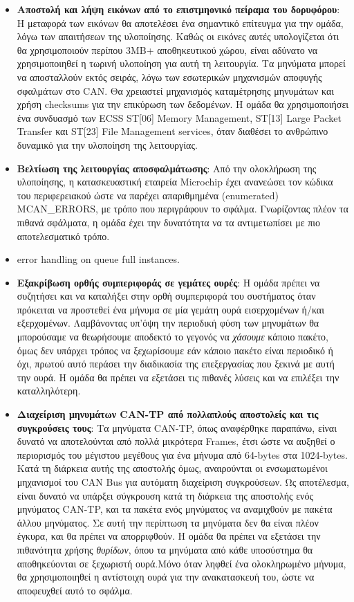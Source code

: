 \documentclass[a4paper,nobib,justified]{tufte-book}
\begin{document}
\begin{itemize}
	\item \textbf{Αποστολή και λήψη εικόνων από το επιστμηονικό πείραμα του δορυφόρου}: Η μεταφορά των εικόνων θα αποτελέσει ένα σημαντικό επίτευγμα για την ομάδα, λόγω των απαιτήσεων της υλοποίησης. Καθώς οι εικόνες αυτές υπολογίζεται ότι θα χρησιμοποιούν περίπου 3MB+ αποθηκευτικού χώρου, είναι αδύνατο να χρησιμοποιηθεί η τωρινή υλοποίηση για αυτή τη λειτουργία. Τα μηνύματα μπορεί να αποσταλλούν εκτός σειράς, λόγω των εσωτερικών μηχανισμών αποφυγής σφαλμάτων στο CAN. Θα χρειαστεί μηχανισμός καταμέτρησης μηνυμάτων και χρήση checksums για την επικύρωση των δεδομένων. Η ομάδα θα χρησιμοποιήσει ένα συνδυασμό των ECSS ST[06] Memory Management, ST[13] Large Packet Transfer και ST[23] File Management services, όταν διαθέσει το ανθρώπινο δυναμικό για την υλοποίηση της λειτουργίας.
	\item \textbf{Βελτίωση της λειτουργίας αποσφαλμάτωσης}: Από την ολοκλήρωση της υλοποίησης, η κατασκευαστική εταιρεία Microchip έχει ανανεώσει τον κώδικα του περιφερειακού ώστε να παρέχει απαριθμημένα (enumerated) MCAN\_ERRORS, με τρόπο που περιγράφουν το σφάλμα. Γνωρίζοντας πλέον τα πιθανά σφάλματα, η ομάδα έχει την δυνατότητα να τα αντιμετωπίσει με πιο αποτελεσματικό τρόπο.
	\item error handling on queue full instances.
	\item \textbf{Εξακρίβωση ορθής συμπεριφοράς σε γεμάτες ουρές}: Η ομάδα πρέπει να συζητήσει και να καταλήξει στην ορθή συμπεριφορά του συστήματος όταν πρόκειται να προστεθεί ένα μήνυμα σε μία γεμάτη ουρά εισερχομένων ή/και εξερχομένων. Λαμβάνοντας υπ'όψη την περιοδική φύση των μηνυμάτων θα μπορούσαμε να θεωρήσουμε αποδεκτό το γεγονός να \emph{χάσουμε} κάποιο πακέτο, όμως δεν υπάρχει τρόπος να ξεχωρίσουμε εάν κάποιο πακέτο είναι περιοδικό ή όχι, πρωτού αυτό περάσει την διαδικασία της επεξεργασίας που ξεκινά με αυτή την ουρά. Η ομάδα θα πρέπει να εξετάσει τις πιθανές λύσεις και να επιλέξει την καταλληλότερη. 
	\item \textbf{Διαχείριση μηνυμάτων CAN-TP από πολλαπλούς αποστολείς και τις συγκρούσεις τους}: Τα μηνύματα CAN-TP, όπως αναφέρθηκε παραπάνω, είναι δυνατό να αποτελούνται από πολλά μικρότερα Frames, έτσι ώστε να αυξηθεί ο περιορισμός του μέγιστου μεγέθους για ένα μήνυμα από 64-bytes στα 1024-bytes. Κατά τη διάρκεια αυτής της αποστολής όμως, αναιρούνται οι ενσωματωμένοι μηχανισμοί του CAN Bus για αυτόματη διαχείριση συγκρούσεων. Ως αποτέλεσμα, είναι δυνατό να υπάρξει σύγκρουση κατά τη διάρκεια της αποστολής ενός μηνύματος CAN-TP, και τα πακέτα ενός μηνύματος να αναμιχθούν με πακέτα άλλου μηνύματος. Σε αυτή την περίπτωση τα μηνύματα δεν θα είναι πλέον έγκυρα, και θα πρέπει να απορριφθούν. Η ομάδα θα πρέπει να εξετάσει την πιθανότητα χρήσης \emph{θυρίδων}, όπου τα μηνύματα από κάθε υποσύστημα θα αποθηκεύονται σε ξεχωριστή ουρά.Μόνο όταν ληφθεί ένα ολοκληρωμένο μήνυμα, θα χρησιμοποιηθεί η αντίστοιχη ουρά για την ανακατασκευή του, ώστε να αποφευχθεί αυτό το σφάλμα.

\end{itemize}
\end{document}
